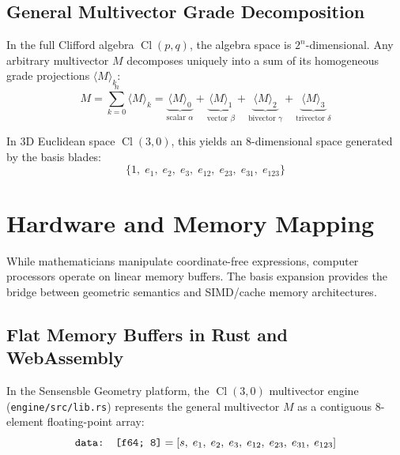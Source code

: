 \documentclass[conference]{IEEEtran}
\begin{document}
\subsection{General Multivector Grade Decomposition}
In the full Clifford algebra $\operatorname{Cl}(p,q)$, the algebra space is $2^n$-dimensional. Any arbitrary multivector $M$ decomposes uniquely into a sum of its homogeneous grade projections $\langle M \rangle_k$:
\begin{equation}
    M = \sum_{k=0}^n \langle M \rangle_k = \underbrace{\langle M \rangle_0}_{\text{scalar } \alpha} + \underbrace{\langle M \rangle_1}_{\text{vector } \beta} + \underbrace{\langle M \rangle_2}_{\text{bivector } \gamma} + \underbrace{\langle M \rangle_3}_{\text{trivector } \delta}
    \label{eq:grade_decomp}
\end{equation}

In 3D Euclidean space $\operatorname{Cl}(3,0)$, this yields an 8-dimensional space generated by the basis blades:
\begin{equation}
    \{ 1,\; e_1,\; e_2,\; e_3,\; e_{12},\; e_{23},\; e_{31},\; e_{123} \}
\end{equation}

\section{Hardware and Memory Mapping}
\label{sec:hardware}

While mathematicians manipulate coordinate-free expressions, computer processors operate on linear memory buffers. The basis expansion provides the bridge between geometric semantics and SIMD/cache memory architectures.

\subsection{Flat Memory Buffers in Rust and WebAssembly}
In the Sensensble Geometry platform, the $\operatorname{Cl}(3,0)$ multivector engine (\texttt{engine/src/lib.rs}) represents the general multivector $M$ as a contiguous 8-element floating-point array:
\begin{equation}
    \text{\texttt{data: [f64; 8]}} = [s,\; e_1,\; e_2,\; e_3,\; e_{12},\; e_{23},\; e_{31},\; e_{123}]
    \label{eq:array_layout}
\end{equation}
\end{document}
